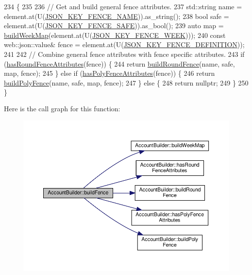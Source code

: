 \begin{DoxyCode}
234 \{
235 
236     \textcolor{comment}{// Get and build general fence attributes.}
237     std::string name = element.at(U(\hyperlink{_fence_8h_a0bf10e901f60610c8a47c143051deea4}{JSON\_KEY\_FENCE\_NAME})).as\_string();
238     \textcolor{keywordtype}{bool} safe = element.at(U(\hyperlink{_fence_8h_a4b2bc1fec134d7881cd286c8b6741752}{JSON\_KEY\_FENCE\_SAFE})).as\_bool();
239     \textcolor{keyword}{auto} map = \hyperlink{class_account_builder_a19b2e3e2c3bbf986f51c0ec53b7dc2a4}{buildWeekMap}(element.at(U(\hyperlink{_fence_8h_a94c5efe13ae824c55eebaa9e8a76dd57}{JSON\_KEY\_FENCE\_WEEK})));
240     \textcolor{keyword}{const} web::json::value& fence = element.at(U(\hyperlink{_fence_8h_a698e69a18d481c1033ae9f7d6fb2e5b6}{JSON\_KEY\_FENCE\_DEFINITION}));
241 
242     \textcolor{comment}{// Combine general fence attributes with fence specific attributes.}
243     \textcolor{keywordflow}{if} (\hyperlink{class_account_builder_aea9045a135dac995cbf409b61c5850bf}{hasRoundFenceAttributes}(fence)) \{
244         \textcolor{keywordflow}{return} \hyperlink{class_account_builder_a0223a0830ba9a0e707c5a2bd5d74ee50}{buildRoundFence}(name, safe, map, fence);
245     \} \textcolor{keywordflow}{else} \textcolor{keywordflow}{if} (\hyperlink{class_account_builder_a426cb519ae4c5f0594f0f1e41e9f5a73}{hasPolyFenceAttributes}(fence)) \{
246         \textcolor{keywordflow}{return} \hyperlink{class_account_builder_a9a93946d8ba8908f6bcfa6b793cc6277}{buildPolyFence}(name, safe, map, fence);
247     \} \textcolor{keywordflow}{else} \{
248         \textcolor{keywordflow}{return} \textcolor{keyword}{nullptr};
249     \}
250 \}
\end{DoxyCode}
Here is the call graph for this function\+:
\nopagebreak
\begin{figure}[H]
\begin{center}
\leavevmode
\includegraphics[width=350pt]{d9/daa/class_account_builder_ac5801a1130d7a1f84a66c45cfd6e0a8d_cgraph}
\end{center}
\end{figure}
